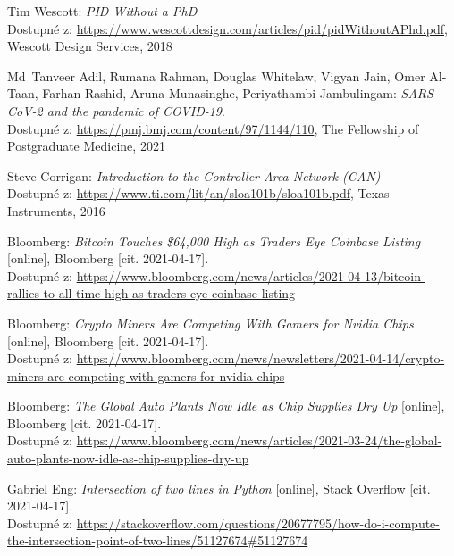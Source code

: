 \documentclass[czech, bachelor]{diploma}
\begin{document}
\renewcommand{\bibname}{Zdroje}
\begin{thebibliography}{20}

Tim Wescott: \textit{PID Without a PhD} \\
Dostupné z: \url{https://www.wescottdesign.com/articles/pid/pidWithoutAPhd.pdf}, Wescott Design Services, 2018

Md~Tanveer Adil, Rumana Rahman, Douglas Whitelaw, Vigyan Jain, Omer Al-Taan, Farhan Rashid, Aruna Munasinghe,
Periyathambi Jambulingam: \textit{SARS-CoV-2 and the pandemic of COVID-19}. \\
Dostupné z: \url{https://pmj.bmj.com/content/97/1144/110}, The Fellowship of Postgraduate Medicine, 2021

Steve Corrigan: \textit{Introduction to the Controller Area Network (CAN)} \\
Dostupné z: \url{https://www.ti.com/lit/an/sloa101b/sloa101b.pdf}, Texas Instruments, 2016

Bloomberg: \textit{Bitcoin Touches \$64,000 High as Traders Eye Coinbase Listing} [online], Bloomberg [cit. 2021-04-17]. \\
Dostupné z:
\url{https://www.bloomberg.com/news/articles/2021-04-13/bitcoin-rallies-to-all-time-high-as-traders-eye-coinbase-listing}

Bloomberg: \textit{Crypto Miners Are Competing With Gamers for Nvidia Chips} [online], Bloomberg [cit. 2021-04-17]. \\
Dostupné z:
\url{https://www.bloomberg.com/news/newsletters/2021-04-14/crypto-miners-are-competing-with-gamers-for-nvidia-chips}

Bloomberg: \textit{The Global Auto Plants Now Idle as Chip Supplies Dry Up} [online], Bloomberg [cit. 2021-04-17]. \\
Dostupné z:
\url{https://www.bloomberg.com/news/articles/2021-03-24/the-global-auto-plants-now-idle-as-chip-supplies-dry-up}

Gabriel Eng: \textit{Intersection of two lines in Python} [online], Stack Overflow [cit. 2021-04-17]. \\
Dostupné z:
\url{https://stackoverflow.com/questions/20677795/how-do-i-compute-the-intersection-point-of-two-lines/51127674\#51127674}


\end{thebibliography}
\end{document}
